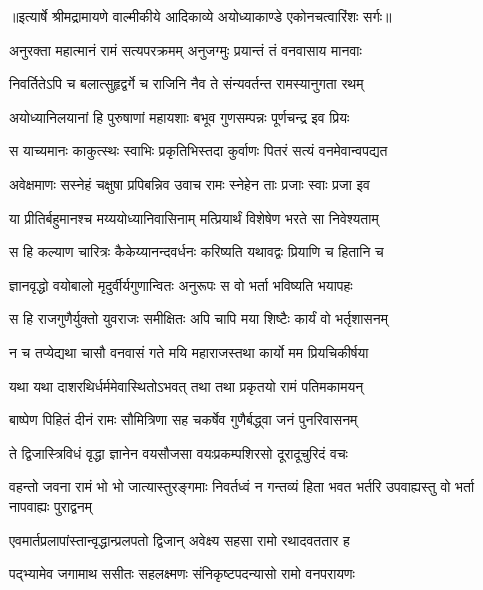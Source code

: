 {॥इत्यार्षे श्रीमद्रामायणे वाल्मीकीये आदिकाव्ये अयोध्याकाण्डे एकोनचत्वारिंशः सर्गः॥}


\twolineshloka
{अनुरक्ता महात्मानं रामं सत्यपरक्रमम्}
{अनुजग्मुः प्रयान्तं तं वनवासाय मानवाः} %

\twolineshloka
{निवर्तितेऽपि च बलात्सुहृद्वर्गे च राजिनि}
{नैव ते संन्यवर्तन्त रामस्यानुगता रथम्} %

\twolineshloka
{अयोध्यानिलयानां हि पुरुषाणां महायशाः}
{बभूव गुणसम्पन्नः पूर्णचन्द्र इव प्रियः} %

\twolineshloka
{स याच्यमानः काकुत्स्थः स्वाभिः प्रकृतिभिस्तदा}
{कुर्वाणः पितरं सत्यं वनमेवान्वपद्यत} %

\twolineshloka
{अवेक्षमाणः सस्नेहं चक्षुषा प्रपिबन्निव}
{उवाच रामः स्नेहेन ताः प्रजाः स्वाः प्रजा इव} %

\twolineshloka
{या प्रीतिर्बहुमानश्च मय्ययोध्यानिवासिनाम्}
{मत्प्रियार्थं विशेषेण भरते सा निवेश्यताम्} %

\twolineshloka
{स हि कल्याण चारित्रः कैकेय्यानन्दवर्धनः}
{करिष्यति यथावद्वः प्रियाणि च हितानि च} %

\twolineshloka
{ज्ञानवृद्धो वयोबालो मृदुर्वीर्यगुणान्वितः}
{अनुरूपः स वो भर्ता भविष्यति भयापहः} %

\twolineshloka
{स हि राजगुणैर्युक्तो युवराजः समीक्षितः}
{अपि चापि मया शिष्टैः कार्यं वो भर्तृशासनम्} %

\twolineshloka
{न च तप्येद्यथा चासौ वनवासं गते मयि}
{महाराजस्तथा कार्यो मम प्रियचिकीर्षया} %

\twolineshloka
{यथा यथा दाशरथिर्धर्ममेवास्थितोऽभवत्}
{तथा तथा प्रकृतयो रामं पतिमकामयन्} %

\twolineshloka
{बाष्पेण पिहितं दीनं रामः सौमित्रिणा सह}
{चकर्षेव गुणैर्बद्ध्वा जनं पुनरिवासनम्} %

\twolineshloka
{ते द्विजास्त्रिविधं वृद्धा ज्ञानेन वयसौजसा}
{वयःप्रकम्पशिरसो दूरादूचुरिदं वचः} %

\threelineshloka
{वहन्तो जवना रामं भो भो जात्यास्तुरङ्गमाः}
{निवर्तध्वं न गन्तव्यं हिता भवत भर्तरि}
{उपवाह्यस्तु वो भर्ता नापवाह्यः पुराद्वनम्} %

\twolineshloka
{एवमार्तप्रलापांस्तान्वृद्धान्प्रलपतो द्विजान्}
{अवेक्ष्य सहसा रामो रथादवततार ह} %

\twolineshloka
{पद्भ्यामेव जगामाथ ससीतः सहलक्ष्मणः}
{संनिकृष्टपदन्यासो रामो वनपरायणः} %

